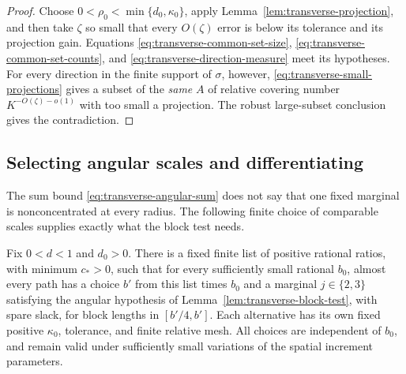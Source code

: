 \begin{proof}
Choose $0<\rho_0<\min\{d_0,\kappa_0\}$, apply
Lemma~\ref{lem:transverse-projection}, and then take $\zeta$ so
small that every $O(\zeta)$ error is below its tolerance and its
projection gain.  Equations
\eqref{eq:transverse-common-set-size},
\eqref{eq:transverse-common-set-counts}, and
\eqref{eq:transverse-direction-measure} meet its hypotheses.
For every direction in the finite support of $\sigma$, however,
\eqref{eq:transverse-small-projections} gives a subset of the
\emph{same} $A$ of relative covering number
$K^{-O(\zeta)-o(1)}$ with too small a projection.  The robust
large-subset conclusion gives the contradiction.
\end{proof}

\subsection{Selecting angular scales and differentiating}

The sum bound \eqref{eq:transverse-angular-sum} does not say that one
fixed marginal is nonconcentrated at every radius.  The following
finite choice of comparable scales supplies exactly what the block
test needs.

\begin{lemma}\label{lem:transverse-angular-choice}
Fix $0<d<1$ and $d_0>0$.  There is a fixed finite list of positive
rational ratios, with minimum $c_*>0$, such that for every sufficiently
small rational $b_0$, almost every path has a choice $b'$ from this
list times $b_0$ and a marginal $j\in\{2,3\}$ satisfying the angular
hypothesis of Lemma~\ref{lem:transverse-block-test}, with spare slack,
for block lengths in $[b'/4,b']$.  Each alternative has its own fixed
positive $\kappa_0$, tolerance, and finite relative mesh.  All choices
are independent of $b_0$, and remain valid under sufficiently small
variations of the spatial increment parameters.
\end{lemma}

